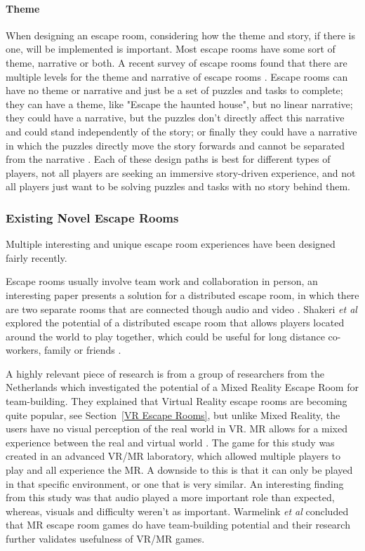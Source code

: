 \documentclass[journal]{IEEEtran}
\begin{document}
\paragraph{Theme}
When designing an escape room, considering how the theme and story, if there is one, will be implemented is important. Most escape rooms have some sort of theme, narrative or both. A recent survey of escape rooms found that there are multiple levels for the theme and narrative of escape rooms \cite{nicholson_state_nodate}. Escape rooms can have no theme or narrative and just be a set of puzzles and tasks to complete; they can have a theme, like "Escape the haunted house", but no linear narrative; they could have a narrative, but the puzzles don't directly affect this narrative and could stand independently of the story; or finally they could have a narrative in which the puzzles directly move the story forwards and cannot be separated from the narrative \cite{nicholson_state_nodate}. Each of these design paths is best for different types of players, not all players are seeking an immersive story-driven experience, and not all players just want to be solving puzzles and tasks with no story behind them.

\subsubsection{Existing Novel Escape Rooms} \label{Novel Escape Rooms}
Multiple interesting and unique escape room experiences have been designed fairly recently. 

Escape rooms usually involve team work and collaboration in person, an interesting paper presents a solution for a distributed escape room, in which there are two separate rooms that are connected though audio and video \cite{shakeri_escaping_2017}. Shakeri \textit{et al} explored the potential of a distributed escape room that allows players located around the world to play together, which could be useful for long distance co-workers, family or friends \cite{shakeri_escaping_2017}.

A highly relevant piece of research is from a group of researchers from the Netherlands \cite{warmelink_amelio:_2017} which investigated the potential of a Mixed Reality Escape Room for team-building. They explained that Virtual Reality escape rooms are becoming quite popular, see Section~\ref{VR Escape Rooms}, but unlike Mixed Reality, the users have no visual perception of the real world in VR. MR allows for a mixed experience between the real and virtual world \cite{warmelink_amelio:_2017}. The game for this study was created in an advanced VR/MR laboratory, which allowed multiple players to play and all experience the MR. A downside to this is that it can only be played in that specific environment, or one that is very similar. An interesting finding from this study was that audio played a more important role than expected, whereas, visuals and difficulty weren't as important. Warmelink \textit{et al} \cite{warmelink_amelio:_2017} concluded that MR escape room games do have team-building potential and their research further validates usefulness of VR/MR games.
\end{document}
